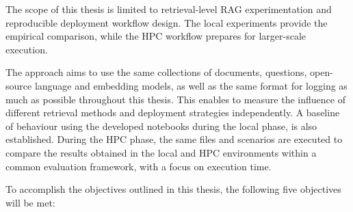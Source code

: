 The scope of this thesis is limited to retrieval-level \ac{RAG} experimentation and reproducible deployment workflow design. The local experiments provide the empirical comparison, while the \ac{HPC} workflow prepares for larger-scale execution.

The approach aims to use the same collections of documents, questions, open-source language and embedding models, as well as the same format for logging as much as possible throughout this thesis. This enables to measure the influence of different retrieval methods and deployment strategies independently. A baseline of behaviour using the developed notebooks during the local phase, is also established. During the \ac{HPC} phase, the same files and scenarios are executed to compare the results obtained in the local and \ac{HPC} environments within a common evaluation framework, with a focus on execution time.

To accomplish the objectives outlined in this thesis, the following five objectives will be met:

